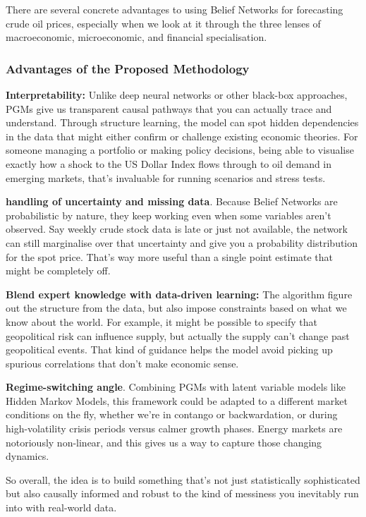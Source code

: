 \documentclass[11pt,a4paper]{article}
\begin{document}
There are several concrete advantages to using Belief Networks for forecasting 
crude oil prices, especially when we look at it through the three lenses of 
macroeconomic, microeconomic, and financial specialisation.

\subsubsection{Advantages of the Proposed Methodology}

\textbf{Interpretability:} Unlike deep neural networks or other black-box approaches, 
PGMs give us transparent causal pathways that you can actually trace and understand. 
Through structure learning, the model can spot hidden dependencies in the data 
that might either confirm or challenge existing economic theories. 
For someone managing a portfolio or making policy decisions, being able to 
visualise exactly how a shock to the US Dollar Index flows through to oil demand 
in emerging markets, that's invaluable for running scenarios and stress tests.

\textbf{handling of uncertainty and missing data}. Because Belief Networks are 
probabilistic by nature, they keep working even when some variables aren't observed. 
Say weekly crude stock data is late or just not available, the network can still 
marginalise over that uncertainty and give you a probability distribution for the 
spot price. That's way more useful than a single point estimate that might be completely off.

\textbf{Blend expert knowledge with data-driven learning: } 
The algorithm figure out the structure from the data, but  
also impose constraints based on what we know about the world. 
For example, it might be possible to 
specify that geopolitical risk can influence supply, but actually the supply can't 
 change past geopolitical events. That kind of guidance helps the model avoid 
picking up spurious correlations that don't make economic sense.

\textbf{Regime-switching angle}. Combining 
PGMs with latent variable models like Hidden Markov Models, this framework 
could be adapted to a different market conditions on the fly, whether we're in contango 
or backwardation, or during high-volatility crisis periods versus calmer growth phases. 
Energy markets are notoriously non-linear, and this gives us a way to 
capture those changing dynamics.

So overall, the idea is to build something that's not just statistically 
sophisticated but also causally informed and robust to the kind of messiness 
you inevitably run into with real-world data.
\end{document}
